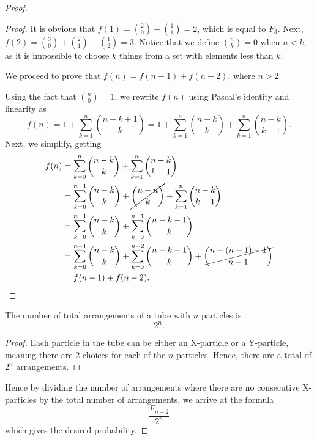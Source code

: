 \begin{proof}
\begin{proof}
  It is obvious that $f(1) = \binom{2}{0} + \binom{1}{1} = 2$, which is equal to $F_{3}$. Next, $f(2) = \binom{3}{0} + \binom{2}{1} + \binom{1}{2} = 3$. Notice that we define $\binom{n}{k} = 0$ when $n < k$, as it is impossible to choose $k$ things from a set with elements less than $k$.

  We proceed to prove that $f(n) = f(n-1) + f(n-2)$, where $n > 2$.

  Using the fact that $\binom{n}{0} = 1$, we rewrite $f(n)$ using Pascal's identity and linearity as \[
    f(n) = 1 + \sum_{k=1}^n \binom{n-k+1}{k} = 1 + \sum_{k=1}^n \binom{n-k}{k} + \sum_{k=1}^n \binom{n-k}{k-1}.
  \] Next, we simplify, getting
  \begin{align*}
    f(n) &= \sum_{k=0}^n \binom{n - k}{k} + \sum_{k=1}^n \binom{n-k}{k-1} \\
         &= \sum_{k=0}^{n-1} \binom{n-k}{k} + \cancel{\binom{n-n}{k}} + \sum_{k=1}^n \binom{n-k}{k-1} \\
         &= \sum_{k=0}^{n-1} \binom{n-k}{k} + \sum_{k=0}^{n-1} \binom{n-k-1}{k} \\
         &= \sum_{k=0}^{n-1} \binom{n-k}{k} + \sum_{k=0}^{n-2} \binom{n-k-1}{k} + \cancel{\binom{n-(n-1)-1}{n-1}} \\
         &= f(n-1) + f(n-2). \qedhere
  \end{align*}
\end{proof}
\begin{claim}
  The number of total arrangements of a tube with $n$ particles is \[2^n.\]
\end{claim}
\begin{proof}
  Each particle in the tube can be either an X-particle or a Y-particle, meaning there are 2 choices for each of the $n$ particles. Hence, there are a total of $2^n$ arrangements.
\end{proof}
Hence by dividing the number of arrangements where there are no consecutive X-particles by the total number of arrangements, we arrive at the formula \[\frac{F_{n+2}}{2^n}\] which gives the desired probability.
\end{proof}
